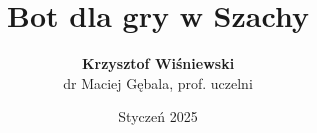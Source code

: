 \documentclass{beamer}
\title[Bot do gry w Szachy]{Bot dla gry w Szachy}
\author[K. Wiśniewski]{\textbf {Krzysztof Wiśniewski} \\ dr Maciej Gębala, prof. uczelni}
\institute[]{
  Politechnika Wrocławska\\
  Wydział Informatyki i Telekomunikacji\\
  Informatyka Algorytmiczna \\
}
\date{Styczeń 2025}
\begin{document}
\begin{frame}
  \titlepage
\end{frame}

  
  
  
  
  
\end{document}
